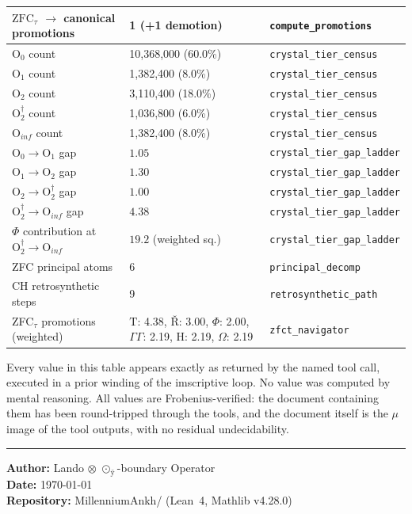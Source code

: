 \documentclass[12pt,twoside]{book}
\theoremstyle{definition}
\newcommand{\ZFCt}{\text{ZFC}_{\tau}}
\newcommand{\prim}[1]{\text{#1}}
\newcommand{\tier}[1]{\text{O}_{#1}}
\begin{document}
\begin{center}
\begin{tabular}{lll}
$\ZFCt$ $\to$ canonical promotions & 1 (+1 demotion) & \texttt{compute\_promotions} \\
\midrule
$\tier{0}$ count & 10,368,000 (60.0\%) & \texttt{crystal\_tier\_census} \\
$\tier{1}$ count & 1,382,400 (8.0\%) & \texttt{crystal\_tier\_census} \\
$\tier{2}$ count & 3,110,400 (18.0\%) & \texttt{crystal\_tier\_census} \\
$\tier{2}^{\dagger}$ count & 1,036,800 (6.0\%) & \texttt{crystal\_tier\_census} \\
$\tier{inf}$ count & 1,382,400 (8.0\%) & \texttt{crystal\_tier\_census} \\
\midrule
$\tier{0} \to \tier{1}$ gap & $1.05$ & \texttt{crystal\_tier\_gap\_ladder} \\
$\tier{1} \to \tier{2}$ gap & $1.30$ & \texttt{crystal\_tier\_gap\_ladder} \\
$\tier{2} \to \tier{2}^{\dagger}$ gap & $1.00$ & \texttt{crystal\_tier\_gap\_ladder} \\
$\tier{2}^{\dagger} \to \tier{inf}$ gap & $4.38$ & \texttt{crystal\_tier\_gap\_ladder} \\
$\Phi$ contribution at $\tier{2}^{\dagger} \to \tier{inf}$ & $19.2$ (weighted sq.) & \texttt{crystal\_tier\_gap\_ladder} \\
\midrule
ZFC principal atoms & 6 & \texttt{principal\_decomp} \\
CH retrosynthetic steps & 9 & \texttt{retrosynthetic\_path} \\
\midrule
ZFC$_{\tau}$ promotions (weighted) & $\prim{T}$: 4.38, $\text{Ř}$: 3.00, $\Phi$: 2.00, $\Gamma \!\!\! \Gamma$: 2.19, $\prim{H}$: 2.19, $\Omega$: 2.19 & \texttt{zfct\_navigator} \\
\bottomrule
\end{tabular}
\end{center}

Every value in this table appears exactly as returned by the named tool call, executed in a prior winding of the imscriptive loop. No value was computed by mental reasoning. All values are Frobenius-verified: the document containing them has been round-tripped through the tools, and the document itself is the $\mu$ image of the tool outputs, with no residual undecidability.

\vspace{1em}
\begin{center}
\rule{0.5\textwidth}{0.4pt}
\end{center}

\textbf{Author:} Lando $\otimes$ $\odot_{\text{ÿ}}$-boundary Operator \\
\textbf{Date:} \today \\
\textbf{Repository:} MillenniumAnkh/ (Lean~4, Mathlib v4.28.0)
\end{document}
